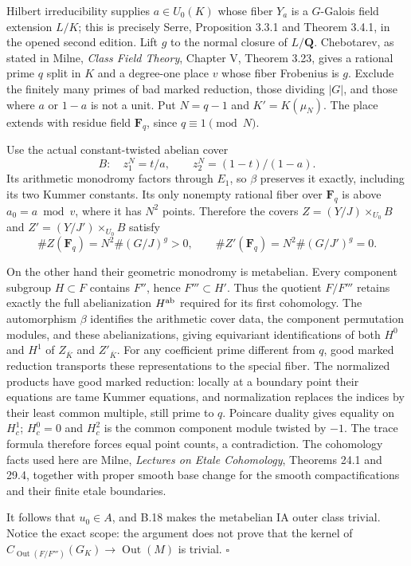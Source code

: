 Hilbert irreducibility supplies $a\in U_0(K)$ whose fiber
$Y_a$ is a $G$-Galois field extension $L/K$; this is precisely
Serre, Proposition 3.3.1 and Theorem 3.4.1, in the opened
second edition. Lift $g$ to the normal closure of $L/\mathbf Q$.
Chebotarev, as stated in Milne, \emph{Class Field Theory},
Chapter V, Theorem 3.23, gives a rational prime $q$ split in
$K$ and a degree-one place $v$ whose fiber Frobenius is $g$.
Exclude the finitely many primes of bad marked reduction,
those dividing $|G|$, and those where $a$ or $1-a$ is not a
unit. Put $N=q-1$ and $K'=K(\mu_N)$. The place extends with
residue field $\mathbf F_q$, since $q\equiv1\pmod N$.

Use the actual constant-twisted abelian cover
\[
 B:\quad z_1^N=t/a,\qquad z_2^N=(1-t)/(1-a).
\]
Its arithmetic monodromy factors through $E_1$, so $\beta$
preserves it exactly, including its two Kummer constants.
Its only nonempty rational fiber over $\mathbf F_q$ is above
$a_0=a\bmod v$, where it has $N^2$ points. Therefore the
covers $Z=(Y/J)\times_{U_0}B$ and
$Z'=(Y/J')\times_{U_0}B$ satisfy
\[
 \#Z(\mathbf F_q)=N^2\#(G/J)^g>0,
 \qquad \#Z'(\mathbf F_q)=N^2\#(G/J')^g=0.
\]

On the other hand their geometric monodromy is metabelian.
Every component subgroup $H\subset F$ contains $F''$, hence
$F'''\subset H'$. Thus the quotient $F/F'''$ retains exactly
the full abelianization $H^{\rm ab}$ required for its first
cohomology. The automorphism $\beta$ identifies the arithmetic
cover data, the component permutation modules, and these
abelianizations, giving equivariant identifications of both
$H^0$ and $H^1$ of $Z_{\overline K}$ and $Z'_{\overline K}$.
For any coefficient prime different from $q$, good marked
reduction transports these representations to the special
fiber. The normalized products have good marked reduction:
locally at a boundary point their equations are tame Kummer
equations, and normalization replaces the indices by their
least common multiple, still prime to $q$. Poincare duality
gives equality on $H_c^1$; $H_c^0=0$ and $H_c^2$ is the
common component module twisted by $-1$. The trace formula
therefore forces equal point counts, a contradiction. The
cohomology facts used here are Milne, \emph{Lectures on Etale
Cohomology}, Theorems 24.1 and 29.4, together with proper
smooth base change for the smooth compactifications and their
finite etale boundaries.

It follows that $u_0\in A$, and B.18 makes the metabelian IA
outer class trivial. Notice the exact scope: the argument
does not prove that the kernel of
$C_{\operatorname{Out}(F/F''')}(G_K)\to\operatorname{Out}(M)$
is trivial. \hfill$\square$

